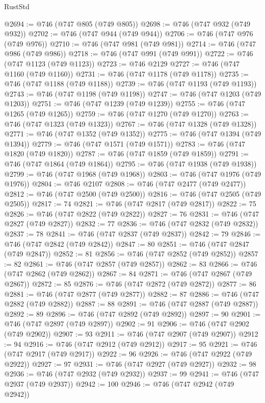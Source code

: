 \begin{lexlean}{RustStd}
\begin{coremodule}
@2694 := @746 (@747 @805 (@749 @805))
@2698 := @746 (@747 @932 (@749 @932))
@2702 := @746 (@747 @944 (@749 @944))
@2706 := @746 (@747 @976 (@749 @976))
@2710 := @746 (@747 @981 (@749 @981))
@2714 := @746 (@747 @986 (@749 @986))
@2718 := @746 (@747 @991 (@749 @991))
@2722 := @746 (@747 @1123 (@749 @1123))
@2723 := @746 @2129
@2727 := @746 (@747 @1160 (@749 @1160))
@2731 := @746 (@747 @1178 (@749 @1178))
@2735 := @746 (@747 @1188 (@749 @1188))
@2739 := @746 (@747 @1193 (@749 @1193))
@2743 := @746 (@747 @1198 (@749 @1198))
@2747 := @746 (@747 @1203 (@749 @1203))
@2751 := @746 (@747 @1239 (@749 @1239))
@2755 := @746 (@747 @1265 (@749 @1265))
@2759 := @746 (@747 @1270 (@749 @1270))
@2763 := @746 (@747 @1323 (@749 @1323))
@2767 := @746 (@747 @1328 (@749 @1328))
@2771 := @746 (@747 @1352 (@749 @1352))
@2775 := @746 (@747 @1394 (@749 @1394))
@2779 := @746 (@747 @1571 (@749 @1571))
@2783 := @746 (@747 @1820 (@749 @1820))
@2787 := @746 (@747 @1859 (@749 @1859))
@2791 := @746 (@747 @1864 (@749 @1864))
@2795 := @746 (@747 @1938 (@749 @1938))
@2799 := @746 (@747 @1968 (@749 @1968))
@2803 := @746 (@747 @1976 (@749 @1976))
@2804 := @746 @2107
@2808 := @746 (@747 @2477 (@749 @2477))
@2812 := @746 (@747 @2500 (@749 @2500))
@2816 := @746 (@747 @2505 (@749 @2505))
@2817 := 74
@2821 := @746 (@747 @2817 (@749 @2817))
@2822 := 75
@2826 := @746 (@747 @2822 (@749 @2822))
@2827 := 76
@2831 := @746 (@747 @2827 (@749 @2827))
@2832 := 77
@2836 := @746 (@747 @2832 (@749 @2832))
@2837 := 78
@2841 := @746 (@747 @2837 (@749 @2837))
@2842 := 79
@2846 := @746 (@747 @2842 (@749 @2842))
@2847 := 80
@2851 := @746 (@747 @2847 (@749 @2847))
@2852 := 81
@2856 := @746 (@747 @2852 (@749 @2852))
@2857 := 82
@2861 := @746 (@747 @2857 (@749 @2857))
@2862 := 83
@2866 := @746 (@747 @2862 (@749 @2862))
@2867 := 84
@2871 := @746 (@747 @2867 (@749 @2867))
@2872 := 85
@2876 := @746 (@747 @2872 (@749 @2872))
@2877 := 86
@2881 := @746 (@747 @2877 (@749 @2877))
@2882 := 87
@2886 := @746 (@747 @2882 (@749 @2882))
@2887 := 88
@2891 := @746 (@747 @2887 (@749 @2887))
@2892 := 89
@2896 := @746 (@747 @2892 (@749 @2892))
@2897 := 90
@2901 := @746 (@747 @2897 (@749 @2897))
@2902 := 91
@2906 := @746 (@747 @2902 (@749 @2902))
@2907 := 93
@2911 := @746 (@747 @2907 (@749 @2907))
@2912 := 94
@2916 := @746 (@747 @2912 (@749 @2912))
@2917 := 95
@2921 := @746 (@747 @2917 (@749 @2917))
@2922 := 96
@2926 := @746 (@747 @2922 (@749 @2922))
@2927 := 97
@2931 := @746 (@747 @2927 (@749 @2927))
@2932 := 98
@2936 := @746 (@747 @2932 (@749 @2932))
@2937 := 99
@2941 := @746 (@747 @2937 (@749 @2937))
@2942 := 100
@2946 := @746 (@747 @2942 (@749 @2942))

\end{coremodule}
\end{lexlean}
